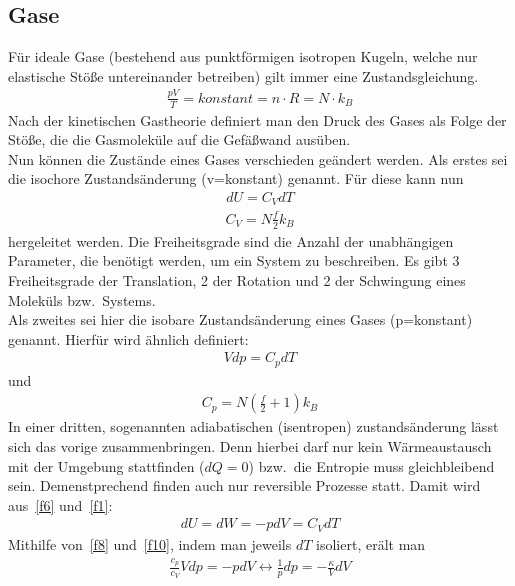 \documentclass[11pt,a4paper]{article}
\begin{document}
 \subsection{Gase}
 F\"ur ideale Gase (bestehend aus punktf\"ormigen isotropen Kugeln, welche nur
 elastische St\"o{\ss}e untereinander betreiben) gilt immer eine Zustandsgleichung.
 \begin{align}
     \label{f5}
     \frac{pV}{T}=konstant=n \cdot R=N \cdot k_{B}
 \end{align}
 Nach der kinetischen Gastheorie definiert man den Druck des Gases als Folge der
 St\"o{\ss}e, die die Gasmolek\"ule auf die Gef\"a{\ss}wand aus\"uben. \\
 Nun k\"onnen die Zust\"ande eines Gases verschieden ge\"andert werden. Als erstes sei
 die isochore Zustands\"anderung (v=konstant) genannt. F\"ur diese kann nun
 \begin{align}
     \label{f6}
     dU=C_{V}dT
 \end{align}
 \begin{align}
     \label{f7}
     C_{V}=N \frac{f}{2} k_{B}
 \end{align}
 hergeleitet werden. Die Freiheitsgrade sind die Anzahl der unabh\"angigen Parameter,
 die ben\"otigt werden, um ein System zu beschreiben. Es gibt 3 Freiheitsgrade der
 Translation, 2 der Rotation und 2 der Schwingung eines Molek\"uls bzw.\ Systems. \\
 Als zweites sei hier die isobare Zustands\"anderung eines Gases (p=konstant) genannt.
 Hierf\"ur wird \"ahnlich definiert:
 \begin{align}
     \label{f8}
     Vdp = C_{p}dT
 \end{align}
 und
 \begin{align}
     \label{f9}
     C_{p}=N\left(\frac{f}{2}+1\right)k_{B}
 \end{align}
 In einer dritten, sogenannten adiabatischen (isentropen) zustands\"anderung l\"asst
 sich das vorige zusammenbringen. Denn hierbei darf nur kein W\"armeaustausch mit der
 Umgebung stattfinden ($dQ=0$) bzw.\ die Entropie muss gleichbleibend sein.
 Demenstprechend finden auch nur reversible Prozesse statt. Damit wird aus~\eqref{f6}
 und~\eqref{f1}:
 \begin{align}
     \label{f10}
     dU=dW=-pdV=C_{V}dT
 \end{align}
 Mithilfe von~\eqref{f8} und~\eqref{f10}, indem man jeweils $dT$ isoliert, er\"alt man
 \begin{align}
     \label{f11}
     \frac{c_{p}}{c_{V}}Vdp=-pdV \leftrightarrow \frac{1}{p}dp=-\frac{\kappa}{V}dV
 \end{align}
\end{document}
